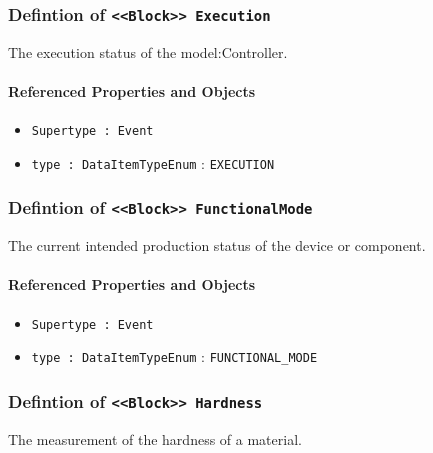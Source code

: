 \subsubsection{Defintion of \texttt{<<Block>> Execution}}
  \label{type:Execution}

\FloatBarrier

The execution status of the {model:Controller}.

\FloatBarrier
\paragraph{Referenced Properties and Objects}

\begin{itemize}
\item \texttt{Supertype : Event}

\item \texttt{type : DataItemTypeEnum} : \texttt{EXECUTION}

\end{itemize}
\FloatBarrier
\subsubsection{Defintion of \texttt{<<Block>> FunctionalMode}}
  \label{type:FunctionalMode}

\FloatBarrier

The current intended production status of the device or component.

\FloatBarrier
\paragraph{Referenced Properties and Objects}

\begin{itemize}
\item \texttt{Supertype : Event}

\item \texttt{type : DataItemTypeEnum} : \texttt{FUNCTIONAL_MODE}

\end{itemize}
\FloatBarrier
\subsubsection{Defintion of \texttt{<<Block>> Hardness}}
  \label{type:Hardness}

\FloatBarrier

The measurement of the hardness of a material.

\FloatBarrier
